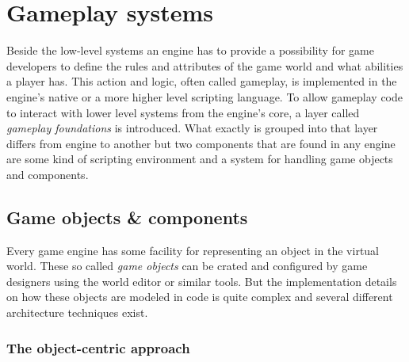 \section{Gameplay systems}

Beside the low-level systems an engine has to provide a possibility for game developers to define the rules and attributes of the game world and what abilities a player has. This action and logic, often called gameplay, is implemented in the engine's native or a more higher level scripting language. To allow gameplay code to interact with lower level systems from the engine's core, a layer called \textit{gameplay foundations} is introduced. What exactly is grouped into that layer differs from engine to another but two components that are found in any engine are some kind of scripting environment and a system for handling game objects and components.

\subsection{Game objects \& components}

Every game engine has some facility for representing an object in the virtual world. These so called \textit{game objects} can be crated and configured by game designers using the world editor or similar tools. But the implementation details on how these objects are modeled in code is quite complex and several different architecture techniques exist. 

\subsubsection{The object-centric approach}

